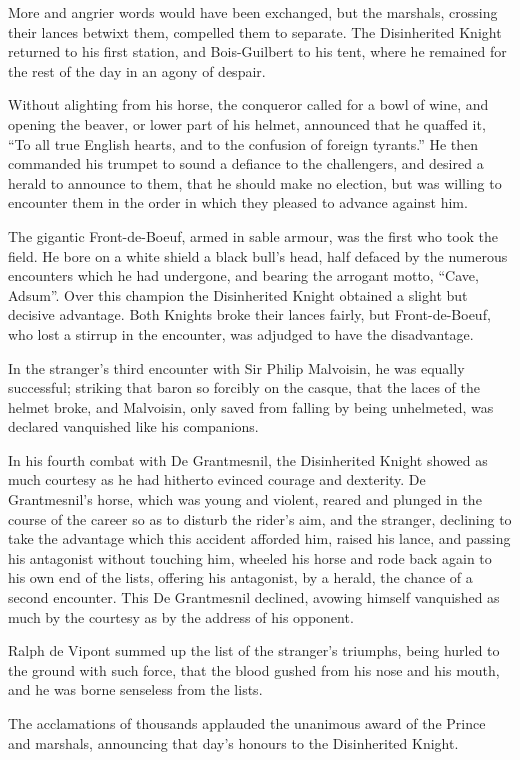 More and angrier words would have been exchanged, but the marshals,
crossing their lances betwixt them, compelled them to separate. The
Disinherited Knight returned to his first station, and Bois-Guilbert to
his tent, where he remained for the rest of the day in an agony of
despair.

Without alighting from his horse, the conqueror called for a bowl of
wine, and opening the beaver, or lower part of his helmet, announced
that he quaffed it, ``To all true English hearts, and to the confusion
of foreign tyrants.'' He then commanded his trumpet to sound a defiance
to the challengers, and desired a herald to announce to them, that he
should make no election, but was willing to encounter them in the order
in which they pleased to advance against him.

The gigantic Front-de-Boeuf, armed in sable armour, was the first who
took the field. He bore on a white shield a black bull's head, half
defaced by the numerous encounters which he had undergone, and bearing
the arrogant motto, ``Cave, Adsum''. Over this champion the Disinherited
Knight obtained a slight but decisive advantage. Both Knights broke
their lances fairly, but Front-de-Boeuf, who lost a stirrup in the
encounter, was adjudged to have the disadvantage.

In the stranger's third encounter with Sir Philip Malvoisin, he was
equally successful; striking that baron so forcibly on the casque, that
the laces of the helmet broke, and Malvoisin, only saved from falling by
being unhelmeted, was declared vanquished like his companions.

In his fourth combat with De Grantmesnil, the Disinherited Knight showed
as much courtesy as he had hitherto evinced courage and dexterity. De
Grantmesnil's horse, which was young and violent, reared and plunged in
the course of the career so as to disturb the rider's aim, and the
stranger, declining to take the advantage which this accident afforded
him, raised his lance, and passing his antagonist without touching him,
wheeled his horse and rode back again to his own end of the lists,
offering his antagonist, by a herald, the chance of a second encounter.
This De Grantmesnil declined, avowing himself vanquished as much by the
courtesy as by the address of his opponent.

Ralph de Vipont summed up the list of the stranger's triumphs, being
hurled to the ground with such force, that the blood gushed from his
nose and his mouth, and he was borne senseless from the lists.

The acclamations of thousands applauded the unanimous award of the
Prince and marshals, announcing that day's honours to the Disinherited
Knight.
